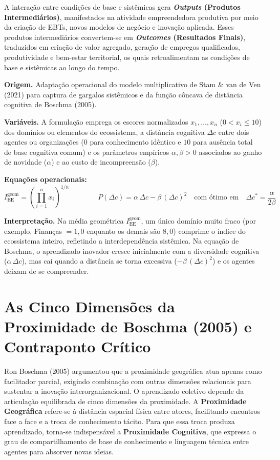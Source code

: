A interação entre condições de base e sistêmicas gera \textbf{\textit{Outputs} (Produtos Intermediários)}, manifestados na atividade empreendedora produtiva por meio da criação de EBTs, novos modelos de negócio e inovação aplicada. Esses produtos intermediários convertem-se em \textbf{\textit{Outcomes} (Resultados Finais)}, traduzidos em criação de valor agregado, geração de empregos qualificados, produtividade e bem-estar territorial, os quais retroalimentam as condições de base e sistêmicas ao longo do tempo.

\begin{boxFormula}
\textbf{Origem.} Adaptação operacional do modelo multiplicativo de Stam \& van de Ven (2021) para captura de gargalos sistêmicos e da função côncava de distância cognitiva de Boschma (2005).

\textbf{Variáveis.} A formulação emprega os escores normalizados $x_1, \dots, x_n$ ($0 < x_i \le 10$) dos domínios ou elementos do ecossistema, a distância cognitiva $\Delta c$ entre dois agentes ou organizações ($0$ para conhecimento idêntico e $10$ para ausência total de base cognitiva comum) e os parâmetros empíricos $\alpha, \beta > 0$ associados ao ganho de novidade ($\alpha$) e ao custo de incompreensão ($\beta$).

\textbf{Equações operacionais:}
\[
I_{\text{EE}}^{\text{geom}} = \left(\prod_{i=1}^{n} x_i\right)^{1/n}
\qquad\qquad
P(\Delta c) = \alpha\,\Delta c - \beta\,(\Delta c)^2
\quad\text{com ótimo em}\quad
\Delta c^* = \frac{\alpha}{2\beta}
\]

\textbf{Interpretação.} Na média geométrica $I_{\text{EE}}^{\text{geom}}$, um único domínio muito fraco (por exemplo, Finanças $= 1{,}0$ enquanto os demais são $8{,}0$) comprime o índice do ecossistema inteiro, refletindo a interdependência sistêmica. Na equação de Boschma, o aprendizado inovador cresce inicialmente com a diversidade cognitiva ($\alpha\,\Delta c$), mas cai quando a distância se torna excessiva ($-\beta\,(\Delta c)^2$) e os agentes deixam de se compreender.
\end{boxFormula}

\section{As Cinco Dimensões da Proximidade de Boschma (2005) e Contraponto Crítico}

Ron Boschma (2005) argumentou que a proximidade geográfica atua apenas como facilitador parcial, exigindo combinação com outras dimensões relacionais para sustentar a inovação interorganizacional. O aprendizado coletivo depende da articulação equilibrada de cinco dimensões da proximidade. A \textbf{Proximidade Geográfica} refere-se à distância espacial física entre atores, facilitando encontros face a face e a troca de conhecimento tácito. Para que essa troca produza aprendizado, torna-se indispensável a \textbf{Proximidade Cognitiva}, que expressa o grau de compartilhamento de base de conhecimento e linguagem técnica entre agentes para absorver novas ideias.


